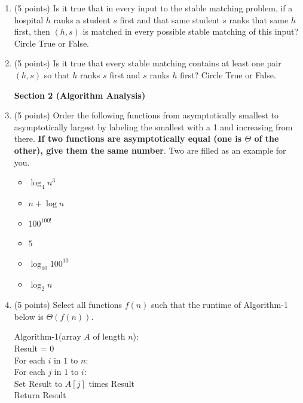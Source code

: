 \documentclass[11pt]{article}
\begin{document}
\begin{enumerate}
\item (5 points) Is it true that in every input to the stable matching problem, if a
hospital $h$ ranks a student $s$ first and that same student $s$ ranks that same
$h$ first, then $(h,s)$ is matched in every possible stable matching of this input?
Circle True or False.

\item (5 points) Is it true that every stable matching contains at least one pair $(h,s)$
so that $h$ ranks $s$ first and $s$ ranks $h$ first?
Circle True or False.

\newpage

\begin{center}
\LARGE\textbf{Section 2 (Algorithm Analysis)\\}%
\end{center}

\item (5 points)
Order the following functions from asymptotically smallest to asymptotically
largest by labeling the smallest with a 1 and increasing from there.  \textbf{If two
functions are asymptotically equal (one is $\Theta$ of the other), give them the
same number}. Two are filled as an example for you.

    \begin{itemize}
        \item[\underline{\hspace{0.5cm}}] $\log_4 n^3$
        \item[\underline{\hspace{0.5cm}}] $n + \log n$
        \item[\underline{\makebox[0.5cm][c]{1}}] $100^{100!}$
        \item[\underline{\makebox[0.5cm][c]{1}}] $5$ 
        \item[\underline{\hspace{0.5cm}}] $\log_{10} 100^{10}$
        \item[\underline{\hspace{0.5cm}}] $\log_2 n$
    \end{itemize}


    \item (5 points) Select all functions $f(n)$ such that the runtime of
Algorithm-1 below is $\Theta(f(n))$.

    \begin{algo}
    Algorithm-1(array $A$ of length $n$):\+\\
    Result = 0\\
    For each $i$ in $1$ to $n$:\+\\
    For each $j$ in $1$ to $i$:\+\\
    Set Result to $A[j]$ times Result\-\- \\
    Return Result\\
    \end{algo} 


\end{enumerate}
\end{document}
